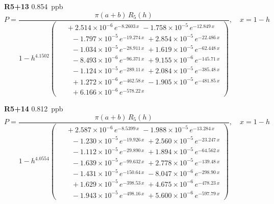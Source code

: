 \documentclass[12pt]{article}
\begin{document}
\noindent\textbf{R5+13} 0.854~ppb\nopagebreak
\begin{equation*}
P = \frac{\pi(a{+}b)\,R_5(h)}{1 - h^{4.1502}\!\left(\!\begin{aligned}
  &\; +2.514{\times}10^{-6}\,e^{-8.2603\,x} \; -1.758{\times}10^{-5}\,e^{-12.849\,x} \\[-3pt]
  &\quad -1.797{\times}10^{-5}\,e^{-19.274\,x} \; +2.854{\times}10^{-5}\,e^{-22.486\,x} \\[-3pt]
  &\quad -1.034{\times}10^{-5}\,e^{-28.911\,x} \; +1.619{\times}10^{-5}\,e^{-62.448\,x} \\[-3pt]
  &\quad -8.493{\times}10^{-6}\,e^{-96.371\,x} \; +9.155{\times}10^{-6}\,e^{-145.71\,x} \\[-3pt]
  &\quad -1.124{\times}10^{-5}\,e^{-289.11\,x} \; +2.084{\times}10^{-5}\,e^{-385.48\,x} \\[-3pt]
  &\quad +1.272{\times}10^{-6}\,e^{-462.58\,x} \; -1.905{\times}10^{-5}\,e^{-481.85\,x} \\[-3pt]
  &\quad +6.166{\times}10^{-6}\,e^{-578.22\,x}
\end{aligned}\!\right)}, \quad x = 1{-}h
\end{equation*}

\noindent\textbf{R5+14} 0.812~ppb\nopagebreak
\begin{equation*}
P = \frac{\pi(a{+}b)\,R_5(h)}{1 - h^{4.0554}\!\left(\!\begin{aligned}
  &\; +2.587{\times}10^{-6}\,e^{-8.5399\,x} \; -1.988{\times}10^{-5}\,e^{-13.284\,x} \\[-3pt]
  &\quad -1.230{\times}10^{-5}\,e^{-19.926\,x} \; +2.560{\times}10^{-5}\,e^{-23.247\,x} \\[-3pt]
  &\quad -1.112{\times}10^{-5}\,e^{-29.890\,x} \; +1.894{\times}10^{-5}\,e^{-64.562\,x} \\[-3pt]
  &\quad -1.639{\times}10^{-5}\,e^{-99.632\,x} \; +2.778{\times}10^{-5}\,e^{-139.48\,x} \\[-3pt]
  &\quad -1.431{\times}10^{-5}\,e^{-150.64\,x} \; -8.047{\times}10^{-6}\,e^{-298.90\,x} \\[-3pt]
  &\quad +1.629{\times}10^{-5}\,e^{-398.53\,x} \; +4.675{\times}10^{-6}\,e^{-478.23\,x} \\[-3pt]
  &\quad -1.943{\times}10^{-5}\,e^{-498.16\,x} \; +5.600{\times}10^{-6}\,e^{-597.79\,x}
\end{aligned}\!\right)}, \quad x = 1{-}h
\end{equation*}
\end{document}
